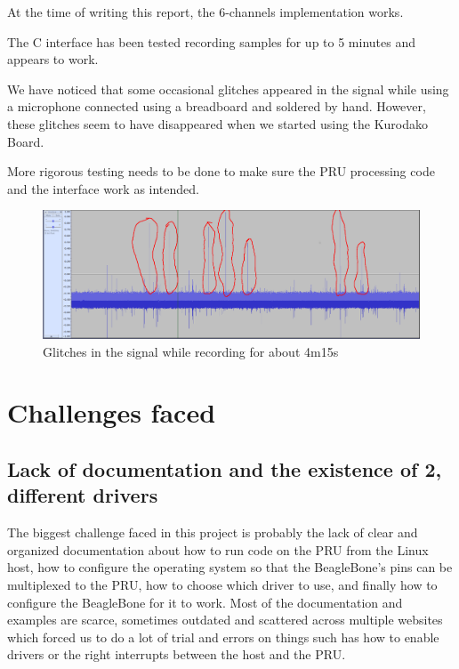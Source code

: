 \documentclass[]{report}
\begin{document}
At the time of writing this report, the 6-channels implementation works.

The C interface has been tested recording samples for up to 5 minutes and appears to work.

We have noticed that some occasional glitches appeared in the signal while using a microphone connected using a breadboard and soldered by hand. However, these glitches seem to have disappeared when we started using the Kurodako Board.

More rigorous testing needs to be done to make sure the PRU processing code and the interface work as intended.

\begin{figure}[h]
\centering
\includegraphics[width=0.8\linewidth]{Pictures/glitches_circled.png}
\caption{Glitches in the signal while recording for about 4m15s}
\end{figure}

\hypertarget{challenges-faced}{%
\chapter{Challenges faced}\label{challenges-faced}}

\hypertarget{lack-of-documentation-and-the-existence-of-2-different-drivers}{%
\section{Lack of documentation and the existence of 2, different
drivers}\label{lack-of-documentation-and-the-existence-of-2-different-drivers}}

The biggest challenge faced in this project is probably the lack of clear and organized documentation about how to run code on the PRU from the Linux host, how to configure the operating system so that the BeagleBone's pins can be multiplexed to the PRU, how to choose which driver to use, and finally how to configure the BeagleBone for it to work. Most of the documentation and examples are scarce, sometimes outdated and scattered across multiple websites which forced us to do a lot of trial and errors on things such has how to enable drivers or the right interrupts between the host and the PRU.
\end{document}
